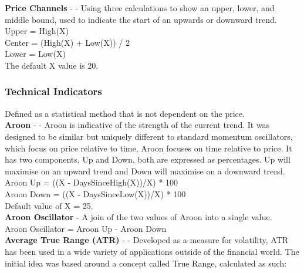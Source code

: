 \documentclass[conference]{IEEEtran}
\begin{document}

\noindent
\textbf{Price Channels} - \cite{Murphy1999} - Using three calculations to show an upper, lower, and middle bound, used to indicate the start of an upwards or downward trend.\\

\noindent
Upper = High(X)\\
Center = (High(X) + Low(X)) / 2\\
Lower = Low(X)\\
The default X value is 20.\\

\subsubsection{Technical Indicators} Defined as a statistical method that is not dependent on the price. \\

\textbf{Aroon} - \cite{Chande1994} - Aroon is indicative of the strength of the current trend. It was designed to be similar but uniquely different to standard momentum oscillators, which focus on price relative to time, Aroon focuses on time relative to price. It has two components, Up and Down, both are expressed as percentages. Up will maximise on an upward trend and Down will maximise on a downward trend.\\

\noindent
Aroon Up = ((X - DaysSinceHigh(X))/X) * 100\\
Aroon Down = ((X - DaysSinceLow(X))/X) * 100\\
Default value of X = 25.\\

\noindent
\textbf{Aroon Oscillator} - A join of the two values of Aroon into a single value.\\
\noindent
Aroon Oscillator = Aroon Up - Aroon Down\\

\noindent
\textbf{Average True Range (ATR)} - \cite{Wilder1978} - Developed as a measure for volatility, ATR has been used in a wide variety of applications outside of the financial world. The initial idea was based around a concept called True Range, calculated as such:\\
\end{document}
